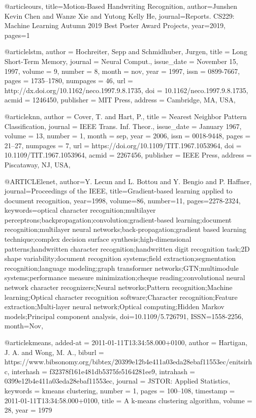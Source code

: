 @article{ours,
  title={Motion-Based Handwriting Recognition},
  author={Junshen Kevin Chen and
               Wanze Xie and
               Yutong Kelly He},
  journal={Reports. CS229: Machine Learning Autumn 2019 Best Poster Award Projects},
  year={2019},
  pages={1}
}

@article{lstm,
 author = {Hochreiter, Sepp and Schmidhuber, Jurgen},
 title = {Long Short-Term Memory},
 journal = {Neural Comput.},
 issue_date = {November 15, 1997},
 volume = {9},
 number = {8},
 month = nov,
 year = {1997},
 issn = {0899-7667},
 pages = {1735--1780},
 numpages = {46},
 url = {http://dx.doi.org/10.1162/neco.1997.9.8.1735},
 doi = {10.1162/neco.1997.9.8.1735},
 acmid = {1246450},
 publisher = {MIT Press},
 address = {Cambridge, MA, USA},
}

@article{knn,
 author = {Cover, T. and Hart, P.},
 title = {Nearest Neighbor Pattern Classification},
 journal = {IEEE Trans. Inf. Theor.},
 issue_date = {January 1967},
 volume = {13},
 number = {1},
 month = sep,
 year = {2006},
 issn = {0018-9448},
 pages = {21--27},
 numpages = {7},
 url = {https://doi.org/10.1109/TIT.1967.1053964},
 doi = {10.1109/TIT.1967.1053964},
 acmid = {2267456},
 publisher = {IEEE Press},
 address = {Piscataway, NJ, USA},
}

@ARTICLE{lenet,
author={Y. {Lecun} and L. {Bottou} and Y. {Bengio} and P. {Haffner}},
journal={Proceedings of the IEEE},
title={Gradient-based learning applied to document recognition},
year={1998},
volume={86},
number={11},
pages={2278-2324},
keywords={optical character recognition;multilayer perceptrons;backpropagation;convolution;gradient-based learning;document recognition;multilayer neural networks;back-propagation;gradient based learning technique;complex decision surface synthesis;high-dimensional patterns;handwritten character recognition;handwritten digit recognition task;2D shape variability;document recognition systems;field extraction;segmentation recognition;language modeling;graph transformer networks;GTN;multimodule systems;performance measure minimization;cheque reading;convolutional neural network character recognizers;Neural networks;Pattern recognition;Machine learning;Optical character recognition software;Character recognition;Feature extraction;Multi-layer neural network;Optical computing;Hidden Markov models;Principal component analysis},
doi={10.1109/5.726791},
ISSN={1558-2256},
month={Nov},
}

@article{kmeans,
  added-at = {2011-01-11T13:34:58.000+0100},
  author = {Hartigan, J. A. and Wong, M. A.},
  biburl = {https://www.bibsonomy.org/bibtex/20399e12b4e411a03eda28ebaf11553ec/enitsirhc},
  interhash = {f32378f161e481db5375fe5164281ee9},
  intrahash = {0399e12b4e411a03eda28ebaf11553ec},
  journal = {JSTOR: Applied Statistics},
  keywords = {kmeans clustering},
  number = 1,
  pages = {100--108},
  timestamp = {2011-01-11T13:34:58.000+0100},
  title = {A k-means clustering algorithm},
  volume = 28,
  year = 1979
}

